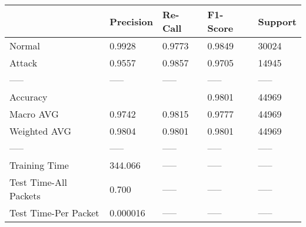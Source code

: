 \begin{tabular}{lllll}
\toprule
{} & Precision & Re-Call & F1-Score & Support \\
\midrule
Normal                &    0.9928 &  0.9773 &   0.9849 &   30024 \\
Attack                &    0.9557 &  0.9857 &   0.9705 &   14945 \\
-----                 &     ----- &   ----- &    ----- &   ----- \\
Accuracy              &           &         &   0.9801 &   44969 \\
Macro AVG             &    0.9742 &  0.9815 &   0.9777 &   44969 \\
Weighted AVG          &    0.9804 &  0.9801 &   0.9801 &   44969 \\
-----                 &     ----- &   ----- &    ----- &   ----- \\
Training Time         &   344.066 &   ----- &    ----- &   ----- \\
Test Time-All Packets &     0.700 &   ----- &    ----- &   ----- \\
Test Time-Per Packet  &  0.000016 &   ----- &    ----- &   ----- \\
\bottomrule
\end{tabular}
